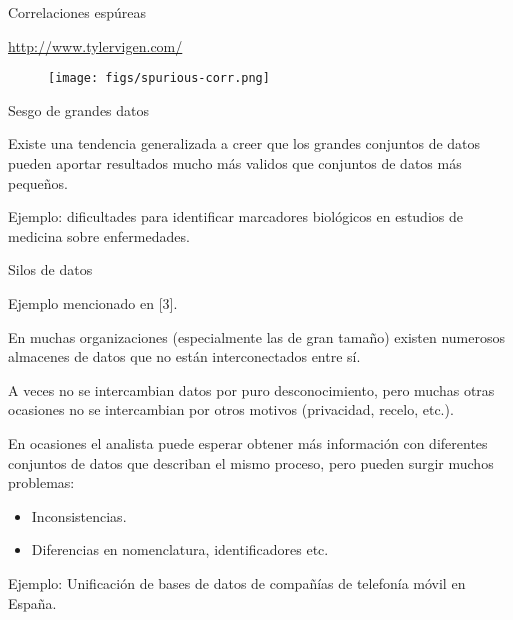 
\begin{frame}{Correlaciones espúreas}
  \begin{wideitemize}
  \item \url{http://www.tylervigen.com/}
 \end{wideitemize}
 
 \begin{figure}
 \centering
 \texttt{[image: figs/spurious-corr.png]}
\end{figure}


\end{frame}


\begin{frame}{Sesgo de grandes datos}
  \begin{wideitemize}
  \item Existe una tendencia generalizada a creer que los grandes conjuntos de
  datos pueden aportar resultados mucho más validos que conjuntos de datos más
  pequeños.
  
  \item Ejemplo: dificultades para identificar marcadores biológicos en estudios
  de medicina sobre enfermedades.

 \end{wideitemize}

\end{frame}


\begin{frame}{Silos de datos}
  \begin{wideitemize}
  \item Ejemplo mencionado en [3].
  
  \item En muchas organizaciones (especialmente las de gran tamaño) existen
  numerosos almacenes de datos que no están interconectados entre sí.
  
  \item A veces no se intercambian datos por puro desconocimiento, pero muchas
  otras ocasiones no se intercambian por otros motivos (privacidad, recelo, etc.).
  
  \item En ocasiones el analista puede esperar obtener más información con diferentes
  conjuntos de datos que describan el mismo proceso, pero pueden surgir muchos
  problemas:
  
  \begin{itemize}
   \item Inconsistencias.
   \item Diferencias en nomenclatura, identificadores etc.
  \end{itemize}

  \item Ejemplo: Unificación de bases de datos de compañías de telefonía móvil en España.

 \end{wideitemize}

\end{frame}

